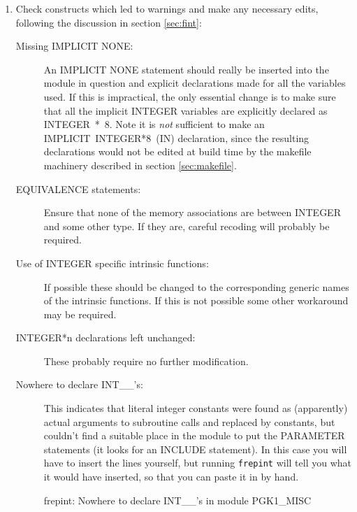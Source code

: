 \documentclass[twoside,11pt,nolof]{starlink}
\providecommand{\xroutine}[1]{\htmlref{\texttt{#1}}{#1}}
\providecommand{\routine}[1]{\texttt{#1}}
\newenvironment{squote}{\begin{small}}{\end{small}}
\begin{document}
\begin{enumerate}
\begin{squote}
\begin{terminalv}
22/25 modified files written in ./frepint.changed.
Logfile is ./frepint.log
\end{terminalv}
\end{squote}
%
\item
Check constructs which led to warnings and make any necessary edits,
following the discussion in section \ref{sec:fint}:
\begin{description}
%
\item[Missing IMPLICIT NONE:]
An IMPLICIT NONE statement should really
be inserted into the module in question and
explicit declarations made for all the variables used.
If this is impractical, the only essential change is to make sure that
all the implicit INTEGER variables are explicitly declared as INTEGER~*~8.
Note it is \textit{not\/} sufficient to make an
IMPLICIT~INTEGER*8~(I\latexhtml{$-$}{-}N)
declaration, since the resulting declarations would not be edited
at build time by
the makefile machinery described in section \ref{sec:makefile}.
%
\item[EQUIVALENCE statements:]
Ensure that none of the memory associations are between INTEGER and some
other type.  If they are, careful recoding will probably be required.
%
\item[Use of INTEGER specific intrinsic functions:]
If possible these should be changed to the corresponding generic
names of the intrinsic functions.
If this is not possible some other workaround may be required.
%
\item[INTEGER*n declarations left unchanged:]
These probably require no further modification.
%
\item[Nowhere to declare INT\_\_'s:]
This indicates that literal integer constants were found as (apparently)
actual arguments to subroutine calls and replaced by constants,
but \xroutine{frepint} couldn't find a suitable place in
the module to put the PARAMETER statements (it looks for an INCLUDE
statement).  In this case you will have to insert the lines yourself,
but running \routine{frepint} will tell you what it would have inserted,
so that you can paste it in by hand.
\begin{squote}
\begin{terminalv}
frepint: Nowhere to declare INT__'s in module PGK1_MISC


\end{terminalv}
\end{squote}
\end{description}
\end{enumerate}
\end{document}
